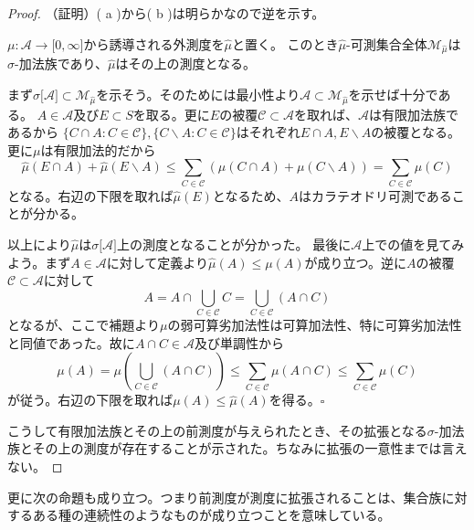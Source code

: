 \documentclass[../root.tex]{subfiles}
\begin{document}
\begin{proof}
（証明）( a )から( b )は明らかなので逆を示す。

$ \mu\colon\mathscr{A}\rightarrow\lbrack 0, \infty \rbrack $から誘導される外測度を$ \widehat{\mu} $と置く。
このとき$ \widehat{\mu} $-可測集合全体$ \mathscr{M}_{\widehat{\mu}} $は$ \sigma $-加法族であり、$ \widehat{\mu} $はその上の測度となる。

まず$ \sigma\lbrack \mathscr{A} \rbrack\subset\mathscr{M}_{\widehat{\mu}} $を示そう。そのためには最小性より$ \mathscr{A}\subset\mathscr{M}_{\widehat{\mu}} $を示せば十分である。
$ A\in\mathscr{A} $及び$ E\subset S $を取る。更に$ E $の被覆$ \mathscr{C}\subset\mathscr{A} $を取れば、$ \mathscr{A} $は有限加法族であるから
$ \lbrace C\cap A : C\in\mathscr{C} \rbrace, \lbrace C\backslash A : C\in\mathscr{C} \rbrace $はそれぞれ$ E\cap A, E\backslash A $の被覆となる。更に$ \mu $は有限加法的だから
\[ \widehat{\mu}( E\cap A )+\widehat{\mu}( E\backslash A ) \le \sum_{C\in\mathscr{C}}( \mu( C\cap A )+\mu( C\backslash A ) ) = \sum_{C\in\mathscr{C}}\mu( C ) \]
となる。右辺の下限を取れば$ \widehat{\mu}( E ) $となるため、$ A $はカラテオドリ可測であることが分かる。

以上により$ \widehat{\mu} $は$ \sigma\lbrack \mathscr{A} \rbrack $上の測度となることが分かった。
最後に$ \mathscr{A} $上での値を見てみよう。まず$ A\in\mathscr{A} $に対して定義より$ \widehat{\mu}( A )\le\mu( A ) $が成り立つ。逆に$ A $の被覆$ \mathscr{C}\subset\mathscr{A} $に対して
\[ A= A\cap\bigcup_{C\in\mathscr{C}}C=\bigcup_{C\in\mathscr{C}}( A\cap C ) \]
となるが、ここで補題より$ \mu $の弱可算劣加法性は可算加法性、特に可算劣加法性と同値であった。故に$ A\cap C\in\mathscr{A} $及び単調性から
\[ \mu( A )=\mu\left( \bigcup_{C\in\mathscr{C}}( A\cap C ) \right)\le\sum_{C\in\mathscr{C}}\mu( A\cap C )\le\sum_{C\in\mathscr{C}}\mu( C ) \]
が従う。右辺の下限を取れば$ \mu( A )\le\widehat{\mu}( A ) $を得る。$ \square $

こうして有限加法族とその上の前測度が与えられたとき、その拡張となる$ \sigma $-加法族とその上の測度が存在することが示された。ちなみに拡張の一意性までは言えない。
\end{proof}

更に次の命題も成り立つ。つまり前測度が測度に拡張されることは、集合族に対するある種の連続性のようなものが成り立つことを意味している。
\end{document}

